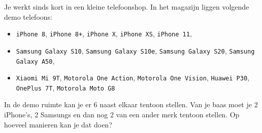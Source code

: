 \documentclass[12pt]{article}
\begin{document}
Je werkt sinds kort in een kleine telefoonshop. In het magazijn liggen volgende demo telefoons:
\begin{itemize}
\item \texttt{iPhone 8}, \texttt{iPhone 8+}, \texttt{iPhone X}, \texttt{iPhone XS}, \texttt{iPhone 11},
\item \texttt{Samsung Galaxy S10}, \texttt{Samsung Galaxy S10e}, \texttt{Samsung Galaxy S20}, \texttt{Samsung Galaxy A50},
\item \texttt{Xiaomi Mi 9T}, \texttt{Motorola One Action}, \texttt{Motorola One Vision}, \texttt{Huawei P30}, \texttt{OnePlus 7T}, \texttt{Motorola Moto G8}
\end{itemize}
In de demo ruimte kan je er 6 naast elkaar tentoon stellen. Van je baas moet je 2 iPhone's, 2 Samsungs en dan nog 2 van een ander merk tentoon stellen. Op hoeveel manieren kan je dat doen?
\end{document}
